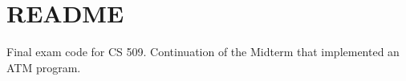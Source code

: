 \chapter{README}
\hypertarget{md__r_e_a_d_m_e}{}\label{md__r_e_a_d_m_e}
Final exam code for CS 509. Continuation of the Midterm that implemented an ATM program. 